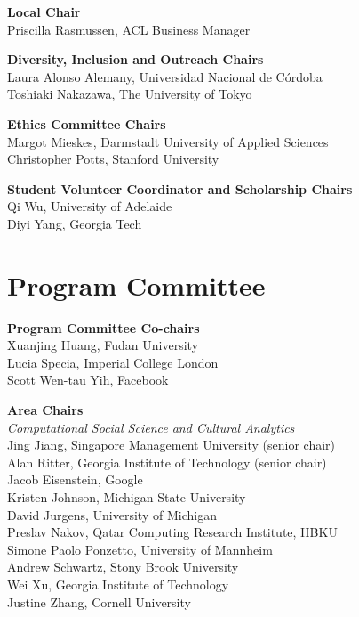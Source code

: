 {\bf Local Chair} \\
Priscilla Rasmussen, ACL Business Manager

{\bf Diversity, Inclusion and Outreach Chairs} \\
Laura Alonso Alemany, Universidad Nacional de Córdoba \\
Toshiaki Nakazawa, The University of Tokyo

{\bf Ethics Committee Chairs} \\
Margot Mieskes, Darmstadt University of Applied Sciences \\
Christopher Potts, Stanford University

{\bf Student Volunteer Coordinator and Scholarship Chairs} \\
Qi Wu, University of Adelaide \\
Diyi Yang, Georgia Tech



\clearpage
\section{Program Committee}
\setlength{\parindent}{0pt}

\vspace*{0.5cm}

{\bf Program Committee Co-chairs} \\
Xuanjing Huang, Fudan University\\
Lucia Specia, Imperial College London\\
Scott Wen-tau Yih, Facebook

{\bf Area Chairs} \\
\emph{Computational Social Science and Cultural Analytics} \\
\hspace*{0.2in} Jing Jiang, Singapore Management University (senior chair)\\
\hspace*{0.2in} Alan Ritter, Georgia Institute of Technology (senior chair)\\
\hspace*{0.2in} Jacob Eisenstein, Google\\
\hspace*{0.2in} Kristen Johnson, Michigan State University\\
\hspace*{0.2in} David Jurgens, University of Michigan\\
\hspace*{0.2in} Preslav Nakov, Qatar Computing Research Institute, HBKU\\
\hspace*{0.2in} Simone Paolo Ponzetto, University of Mannheim\\
\hspace*{0.2in} Andrew Schwartz, Stony Brook University\\
\hspace*{0.2in} Wei Xu, Georgia Institute of Technology\\
\hspace*{0.2in} Justine Zhang, Cornell University\\

